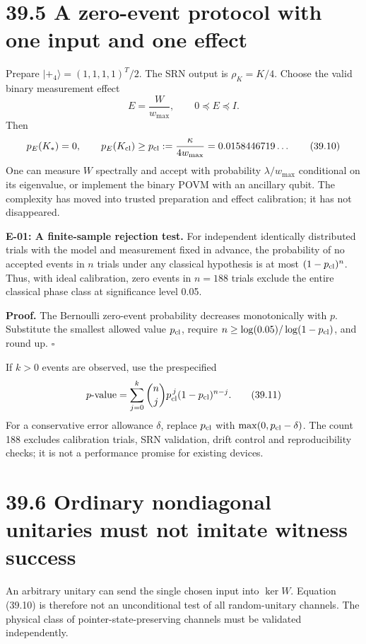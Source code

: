 \documentclass[
  11pt,
  oneside]{book}
\begin{document}
\section{39.5 A zero-event protocol with one input and one effect}

Prepare \(|+\!_4\rangle=(1,1,1,1)^T/2\). The SRN output is
\(\rho_K=K/4\). Choose the valid binary measurement effect \[
E=\frac{W}{w_{\max}},\qquad 0\preceq E\preceq I.
\tag{39.9}
\] Then \[
p_E(K_*)=0,\qquad
p_E(K_{\rm cl})\ge
p_{\rm cl}:=\frac{\kappa}{4w_{\max}}
=0.0158446719\ldots
\tag{39.10}
\] One can measure \(W\) spectrally and accept with probability
\(\lambda/w_{\max}\) conditional on its eigenvalue, or implement the
binary POVM with an ancillary qubit. The complexity has moved into
trusted preparation and effect calibration; it has not disappeared.

\label{e-01}{}

\textbf{E-01: A finite-sample rejection test.} For independent
identically distributed trials with the model and measurement fixed in
advance, the probability of no accepted events in \(n\) trials under any
classical hypothesis is at most \((1-p_{\rm cl})^n\). Thus, with ideal
calibration, zero events in \(n=188\) trials exclude the entire
classical phase class at significance level 0.05.

\textbf{Proof.} The Bernoulli zero-event probability decreases
monotonically with \(p\). Substitute the smallest allowed value
\(p_{\rm cl}\), require \(n\ge\log(0.05)/\log(1-p_{\rm cl})\), and round
up. \(\square\)

If \(k>0\) events are observed, use the prespecified \[
p\text{-value}=\sum_{j=0}^k{n\choose j}p_{\rm cl}^{\,j}(1-p_{\rm cl})^{n-j}.
\tag{39.11}
\] For a conservative error allowance \(\delta\), replace \(p_{\rm cl}\)
with \(\max(0,p_{\rm cl}-\delta)\). The count 188 excludes calibration
trials, SRN validation, drift control and reproducibility checks; it is
not a performance promise for existing devices.

\section{39.6 Ordinary nondiagonal unitaries must not imitate witness
success}

An arbitrary unitary can send the single chosen input into \(\ker W\).
Equation (39.10) is therefore not an unconditional test of all
random-unitary channels. The physical class of pointer-state-preserving
channels must be validated independently.
\end{document}
